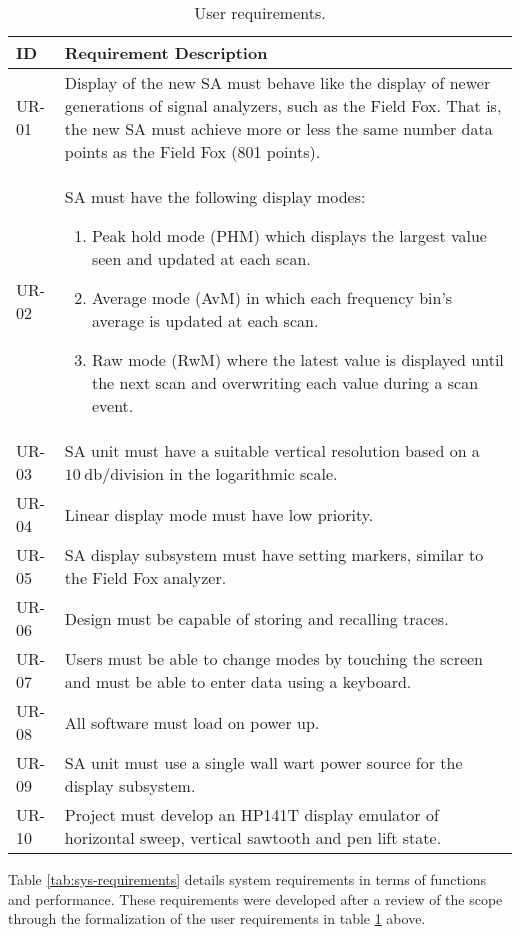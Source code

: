 \documentclass[class=report,11pt,crop=false]{standalone}
\begin{document}
\begin{table}[!ht]
	\centering
	\caption{User requirements.}
	\label{tab:user-requirements}
	\begin{tabular}{|m{5em}|m{40em}|}
		\hline
		\textbf{ID}	& \textbf{Requirement Description}\\
		\hline
		UR-01	& Display of the new SA must behave like the display of newer generations of signal analyzers, such as the Field Fox. That is, the new SA must achieve more or less the same number data points as the Field Fox (801 points). \\
		\hline
		UR-02	& SA must have the following display modes:
		\begin{enumerate}[label=(\alph*)]
			\item 
			Peak hold mode (PHM) which displays the largest value seen and updated at each scan.
			\item 
			Average mode (AvM) in which each frequency bin's average is updated at each scan. 
			\item 
			Raw mode (RwM) where the latest value is displayed until the next scan and overwriting each value during a scan event.
		\end{enumerate}\\
		\hline
		UR-03	& SA unit must have a suitable vertical resolution based on a $\SI{10}{\decibel}\text{/division}$ in the logarithmic scale.\\
		\hline
		UR-04	& Linear display mode must have low priority.\\
		\hline
		UR-05	& SA display subsystem must have setting markers, similar to the Field Fox analyzer.\\
		\hline
		UR-06	& Design must be capable of storing and recalling traces.\\
		\hline
		UR-07	& Users must be able to change modes by touching the screen and must be able to enter data using a keyboard.\\
		\hline
		UR-08	& All software must load on power up.\\
		\hline
		UR-09	& SA unit must use a single wall wart power source for the display subsystem.\\
		\hline
		UR-10	& Project must develop an HP141T display emulator of horizontal sweep, vertical sawtooth and pen lift state.\\
		\hline
	\end{tabular}
\end{table}

Table \ref{tab:sys-requirements} details system requirements in terms of functions and performance. These requirements were developed after a review of the scope through the formalization of the user requirements in table \ref{tab:user-requirements} above.
\end{document}

